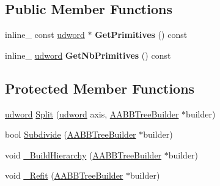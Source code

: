 \subsection*{Public Member Functions}
\begin{DoxyCompactItemize}
\item 
inline\+\_\+ const \hyperlink{IceTypes_8h_a44c6f1920ba5551225fb534f9d1a1733}{udword} $\ast$ {\bfseries Get\+Primitives} () const \hypertarget{classOpcode_1_1AABBTreeNode_aa1171a159544b7ba5a4867078d6779ad}{}\label{classOpcode_1_1AABBTreeNode_aa1171a159544b7ba5a4867078d6779ad}

\item 
inline\+\_\+ \hyperlink{IceTypes_8h_a44c6f1920ba5551225fb534f9d1a1733}{udword} {\bfseries Get\+Nb\+Primitives} () const \hypertarget{classOpcode_1_1AABBTreeNode_aff39cd631d8de320ea7cfb8a1aa717ed}{}\label{classOpcode_1_1AABBTreeNode_aff39cd631d8de320ea7cfb8a1aa717ed}

\end{DoxyCompactItemize}
\subsection*{Protected Member Functions}
\begin{DoxyCompactItemize}
\item 
\hyperlink{IceTypes_8h_a44c6f1920ba5551225fb534f9d1a1733}{udword} \hyperlink{classOpcode_1_1AABBTreeNode_aefc4588f956b98d324b26d9dbecc20f8}{Split} (\hyperlink{IceTypes_8h_a44c6f1920ba5551225fb534f9d1a1733}{udword} axis, \hyperlink{classOpcode_1_1AABBTreeBuilder}{A\+A\+B\+B\+Tree\+Builder} $\ast$builder)
\item 
bool \hyperlink{classOpcode_1_1AABBTreeNode_a30febc55e0cd39f7114f02395e2a69f5}{Subdivide} (\hyperlink{classOpcode_1_1AABBTreeBuilder}{A\+A\+B\+B\+Tree\+Builder} $\ast$builder)
\item 
void \hyperlink{classOpcode_1_1AABBTreeNode_acf08af7ca37efb06780ef3ff433effcd}{\+\_\+\+Build\+Hierarchy} (\hyperlink{classOpcode_1_1AABBTreeBuilder}{A\+A\+B\+B\+Tree\+Builder} $\ast$builder)
\item 
void \hyperlink{classOpcode_1_1AABBTreeNode_a9b07d0707b9b2d043a60672f3c9cb47a}{\+\_\+\+Refit} (\hyperlink{classOpcode_1_1AABBTreeBuilder}{A\+A\+B\+B\+Tree\+Builder} $\ast$builder)
\end{DoxyCompactItemize}
